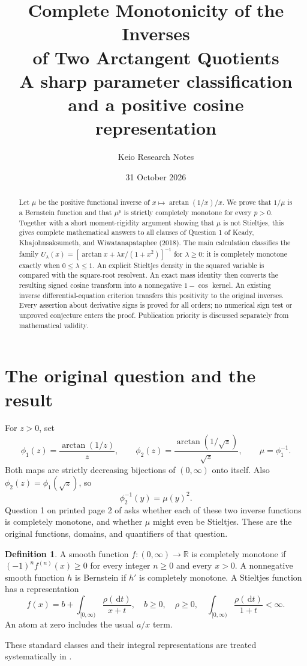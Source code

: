 \documentclass[11pt,a4paper]{article}
\title{Complete Monotonicity of the Inverses\\of Two Arctangent Quotients\\[5pt]
\large A sharp parameter classification and a positive cosine representation}
\author{Keio Research Notes}
\date{31 October 2026}
\theoremstyle{definition}\newtheorem{definition}[theorem]{Definition}
\theoremstyle{remark}\newtheorem{remark}[theorem]{Remark}
\newcommand{\dd}{\,\mathrm d}
\begin{document}
\maketitle
\begin{abstract}
Let $\mu$ be the positive functional inverse of
$x\mapsto \arctan(1/x)/x$. We prove that $1/\mu$ is a Bernstein
function and that $\mu^p$ is strictly completely monotone for every
$p>0$. Together with a short moment-rigidity argument showing that
$\mu$ is not Stieltjes, this gives complete mathematical answers to
all clauses of Question 1 of Keady, Khajohnsaksumeth, and
Wiwatanapataphee (2018). The main calculation classifies the family
$U_\lambda(x)=[\arctan x+\lambda x/(1+x^2)]^{-1}$ for
$\lambda\ge0$: it is completely monotone exactly when
$0\le\lambda\le1$. An explicit Stieltjes density in the squared
variable is compared with the square-root resolvent. An exact mass
identity then converts the resulting signed cosine transform into
a nonnegative $1-\cos$ kernel. An existing inverse differential-equation
criterion transfers this positivity to the original inverses.
Every assertion about derivative signs is proved for all orders;
no numerical sign test or unproved conjecture enters the proof.
Publication priority is discussed separately from mathematical validity.
\end{abstract}

\section{The original question and the result}

For $z>0$, set
\begin{equation}\label{eq:original}
 \phi_1(z)=\frac{\arctan(1/z)}{z},\qquad
 \phi_2(z)=\frac{\arctan(1/\sqrt z)}{\sqrt z},\qquad
 \mu=\phi_1^{-1}.
\end{equation}
Both maps are strictly decreasing bijections of $(0,\infty)$ onto
itself. Also $\phi_2(z)=\phi_1(\sqrt z)$, so
\begin{equation}\label{eq:inverse-square}
 \phi_2^{-1}(y)=\mu(y)^2.
\end{equation}
Question 1 on printed page 2 of \cite{KKW2018} asks whether each
of these two inverse functions is completely monotone, and whether
$\mu$ might even be Stieltjes. These are the original functions,
domains, and quantifiers of that question.

\begin{definition}
A smooth function $f:(0,\infty)\to\mathbb R$ is completely monotone
if $(-1)^n f^{(n)}(x)\ge0$ for every integer $n\ge0$ and every $x>0$.
A nonnegative smooth function $h$ is Bernstein if $h'$ is completely
monotone. A Stieltjes function has a representation
\[
 f(x)=b+\int_{[0,\infty)}\frac{\rho(\dd t)}{x+t},
 \quad b\ge0,\quad \rho\ge0,\quad
 \int_{[0,\infty)}\frac{\rho(\dd t)}{1+t}<\infty.
\]
An atom at zero includes the usual $a/x$ term.
\end{definition}
These standard classes and their integral representations are treated
systematically in \cite{SSV2012}.
\end{document}
